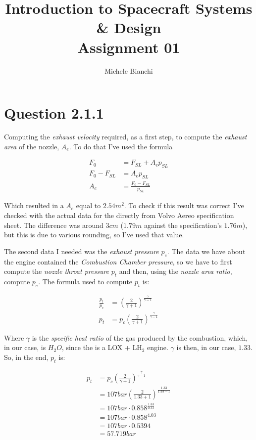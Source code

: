 \documentclass[9pt,a4paper]{scrreprt}
\title{Introduction to Spacecraft Systems \& Design \\
       Assignment 01}
\author{Michele Bianchi}
\begin{document}
    \maketitle

    \section*{Question 2.1.1}

      Computing the \emph{exhaust velocity} required, as a first step, to compute
      the \emph{exhaust area} of the nozzle, $A_e$. To do that I've used
      the formula

      \begin{align*}
        F_0 &= F_{SL} + A_e p_{SL} \\
        F_0 - F_{SL} &= A_e p_{SL} \\
        A_e &= \frac{F_0 - F_{SL}}{p_{SL}}
      \end{align*}

      Which resulted in a $A_e$ equal to $2.54m^2$. To check if this result
      was correct I've checked with the actual data for the
       directly from Volvo Aereo specification sheet.
      The difference was around $3cm$ ($1.79m$ against the specification's
      $1.76m$), but this is due to various rounding, so I've used that value.

      The second data I needed was the \emph{exhaust pressure} $p_e$. The
      data we have about the engine contained the \emph{Combustion Chamber
      pressure}, so we have to first compute the \emph{nozzle throat
      pressure} $p_t$ and then, using the \emph{nozzle area ratio}, compute
      $p_e$. The formula used to compute $p_t$ is:

      \begin{align*}
        \frac{p_t}{p_c} &= {\left( \frac{2}{\gamma + 1} \right)}^{\frac{\gamma}{\gamma - 1}} \\
        p_t &= p_c {\left( \frac{2}{\gamma + 1} \right)}^{\frac{\gamma}{\gamma - 1}}
      \end{align*}

      Where $\gamma$ is the \emph{specific heat ratio} of the gas produced by the combustion, which, in our
      case, is $H_2O$, since the  is a LOX + LH$_2$ engine. $\gamma$ is then, in our case,
      $1.33$. So, in the end, $p_t$ is:

      \begin{align*}
        p_t &= p_c {\left( \frac{2}{\gamma + 1} \right)}^{\frac{\gamma}{\gamma - 1}} \\
            &= 107 bar {\left( \frac{2}{1.33 + 1} \right)}^{\frac{1.33}{1.33 - 1}} \\
            &= 107 bar \cdot 0.858^{\frac{1.33}{0.33}} \\
            &= 107 bar \cdot 0.858^{4.03} \\
            &= 107 bar \cdot 0.5394 \\
            &= 57.719 bar
      \end{align*}
\end{document}
